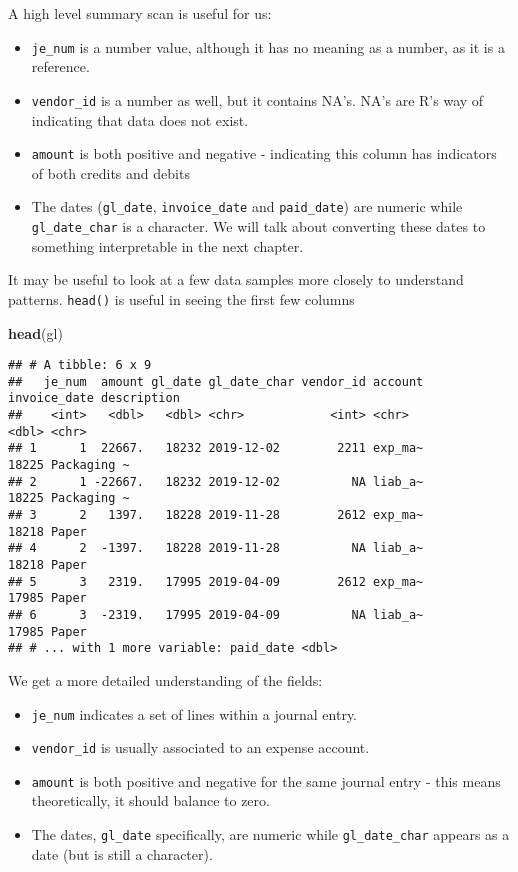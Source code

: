 \documentclass[
]{book}
\newenvironment{Shaded}{\begin{snugshade}}{\end{snugshade}}
\newcommand{\KeywordTok}[1]{\textcolor[rgb]{0.13,0.29,0.53}{\textbf{#1}}}
\newcommand{\NormalTok}[1]{#1}
\providecommand{\tightlist}{%
  \setlength{\itemsep}{0pt}\setlength{\parskip}{0pt}}
\begin{document}
A high level summary scan is useful for us:

\begin{itemize}
\tightlist
\item
  \texttt{je\_num} is a number value, although it has no meaning as a number, as it is a reference.
\item
  \texttt{vendor\_id} is a number as well, but it contains NA's. NA's are R's way of indicating that data does not exist.
\item
  \texttt{amount} is both positive and negative - indicating this column has indicators of both credits and debits
\item
  The dates (\texttt{gl\_date}, \texttt{invoice\_date} and \texttt{paid\_date}) are numeric while \texttt{gl\_date\_char} is a character. We will talk about converting these dates to something interpretable in the next chapter.
\end{itemize}

It may be useful to look at a few data samples more closely to understand patterns. \texttt{head()} is useful in seeing the first few columns

\begin{Shaded}
\begin{Highlighting}[]
\KeywordTok{head}\NormalTok{(gl)}
\end{Highlighting}
\end{Shaded}

\begin{verbatim}
## # A tibble: 6 x 9
##   je_num  amount gl_date gl_date_char vendor_id account invoice_date description
##    <int>   <dbl>   <dbl> <chr>            <int> <chr>          <dbl> <chr>      
## 1      1  22667.   18232 2019-12-02        2211 exp_ma~        18225 Packaging ~
## 2      1 -22667.   18232 2019-12-02          NA liab_a~        18225 Packaging ~
## 3      2   1397.   18228 2019-11-28        2612 exp_ma~        18218 Paper      
## 4      2  -1397.   18228 2019-11-28          NA liab_a~        18218 Paper      
## 5      3   2319.   17995 2019-04-09        2612 exp_ma~        17985 Paper      
## 6      3  -2319.   17995 2019-04-09          NA liab_a~        17985 Paper      
## # ... with 1 more variable: paid_date <dbl>
\end{verbatim}

We get a more detailed understanding of the fields:

\begin{itemize}
\tightlist
\item
  \texttt{je\_num} indicates a set of lines within a journal entry.
\item
  \texttt{vendor\_id} is usually associated to an expense account.
\item
  \texttt{amount} is both positive and negative for the same journal entry - this means theoretically, it should balance to zero.
\item
  The dates, \texttt{gl\_date} specifically, are numeric while \texttt{gl\_date\_char} appears as a date (but is still a character).
\end{itemize}
\end{document}
